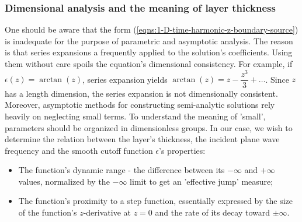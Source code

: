 \documentclass[12pt,twoside]{article}
\begin{document}
\subsubsection{Dimensional analysis and the meaning of layer thickness}
One should be aware that the form (\ref{eqns:1-D-time-harmonic-z-boundary-source}) is inadequate for the purpose of parametric and asymptotic analysis. The reason is that series expansions a frequently applied to the solution's coefficients. Using them without care spoils the equation's dimensional consistency. For example, if $\epsilon(z) = \arctan(z)$, series expansion yields $\arctan(z) = z-\dfrac{z^3}{3} + \ldots$. Since $z$ has a length dimension, the series expansion is not dimensionally consistent. Moreover, asymptotic methods for constructing semi-analytic solutions rely heavily on neglecting small terms. To understand the meaning of 'small', parameters should be organized in dimensionless groups. In our case, we wish to determine the relation between the layer's thickness, the incident plane wave frequency and the smooth cutoff function $\epsilon$'s properties: 
\begin{itemize}
\item The function's  dynamic range - the difference between its $-\infty$ and $+\infty$ values, normalized by the $-\infty$ limit to  get an 'effective jump' measure;
\item The function's proximity to a step function, essentially expressed by the size of the function's $z$-derivative at $z=0$ and the rate of its decay toward $\pm \infty$.
\end{itemize}
\end{document}
